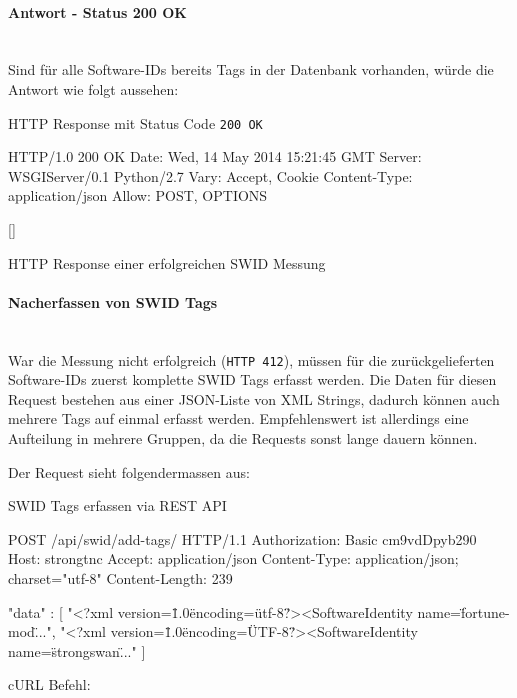 \paragraph{Antwort - Status 200 OK} \hspace{0pt} \\
Sind für alle Software-IDs bereits Tags in der Datenbank vorhanden, würde die
Antwort wie folgt aussehen:

\begin{listing}[H]
\caption{HTTP Response mit Status Code \texttt{200 OK}}
\begin{httpcode}
HTTP/1.0 200 OK
Date: Wed, 14 May 2014 15:21:45 GMT
Server: WSGIServer/0.1 Python/2.7
Vary: Accept, Cookie
Content-Type: application/json
Allow: POST, OPTIONS

[]
\end{httpcode}
\caption{HTTP Response einer erfolgreichen SWID Messung}
\end{listing}

\paragraph{Nacherfassen von SWID Tags}\hspace{0pt} \\
War die Messung nicht erfolgreich (\texttt{HTTP 412}), müssen für die
zurückgelieferten Software-IDs zuerst komplette SWID Tags erfasst werden. Die
Daten für diesen Request bestehen aus einer JSON-Liste von XML Strings, dadurch
können auch mehrere Tags auf einmal erfasst werden. Empfehlenswert ist
allerdings eine Aufteilung in mehrere Gruppen, da die Requests sonst lange
dauern können.

Der Request sieht folgendermassen aus:

\begin{listing}[H]
\caption{SWID Tags erfassen via REST API}
\begin{httpcode}
POST /api/swid/add-tags/ HTTP/1.1
Authorization: Basic cm9vdDpyb290
Host: strongtnc
Accept: application/json
Content-Type: application/json; charset="utf-8"
Content-Length: 239

{ "data" : 
	[
		"<?xml version=\"1.0\" encoding=\"utf-8\"?><SoftwareIdentity name=\"fortune-mod\"...",
		"<?xml version=\"1.0\" encoding=\"UTF-8\"?><SoftwareIdentity name=\"strongswan\"..."
	]
}

\end{httpcode}
\end{listing}

cURL Befehl:

